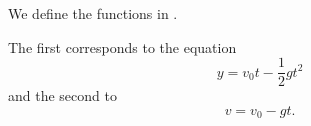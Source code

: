 We define the functions in .

The first corresponds to the equation
\[
    y = v_0 t - \frac{1}{2}g t^2
\]
and the second to
\[
    v = v_0 - gt.
\]
